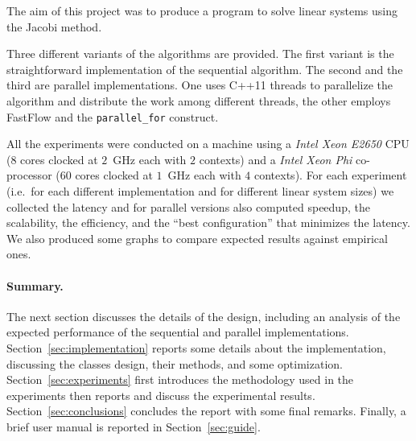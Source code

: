 The aim of this project was to produce a program to solve linear systems using the Jacobi method.

Three different variants of the algorithms are provided.
The first variant is the straightforward implementation of the sequential algorithm.
The second and the third are parallel implementations.
One uses C++11 threads to parallelize the algorithm and distribute the work among different threads, the other employs FastFlow and the \verb|parallel_for| construct.

All the experiments were conducted on a machine using a \emph{Intel Xeon E2650} CPU ($8$ cores clocked at $2$~\si{\giga\hertz} each with $2$ contexts) and a \emph{Intel Xeon Phi} co-processor ($60$ cores clocked at $1$~\si{\giga\hertz} each with $4$ contexts).
For each experiment (i.e.\ for each different implementation and for different linear system sizes) we collected the latency and for parallel versions also computed speedup, the scalability, the efficiency, and the ``best configuration'' that minimizes the latency.
We also produced some graphs to compare expected results against empirical ones.

\paragraph{Summary.} The next section discusses the details of the design, including an analysis of the expected performance of the sequential and parallel implementations.
Section~\ref{sec:implementation} reports some details about the implementation, discussing the classes design, their methods, and some optimization.
Section~\ref{sec:experiments} first introduces the methodology used in the experiments then reports and discuss the experimental results.
Section~\ref{sec:conclusions} concludes the report with some final remarks.
Finally, a brief user manual is reported in Section~\ref{sec:guide}.